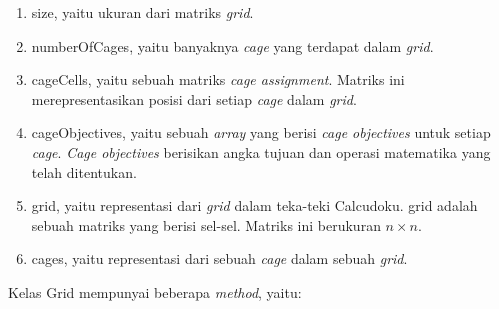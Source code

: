 \begin{enumerate}
\item size, yaitu ukuran dari matriks \textit{grid}.
\item numberOfCages, yaitu banyaknya \textit{cage} yang terdapat dalam \textit{grid}.
\item cageCells, yaitu sebuah matriks \textit{cage assignment}. Matriks ini merepresentasikan posisi dari setiap \textit{cage} dalam \textit{grid}.
\item cageObjectives, yaitu sebuah \textit{array} yang berisi \textit{cage objectives} untuk setiap \textit{cage}. \textit{Cage objectives} berisikan angka tujuan dan operasi matematika yang telah ditentukan.
\item grid, yaitu representasi dari \textit{grid} dalam teka-teki Calcudoku. grid adalah sebuah matriks yang berisi sel-sel. Matriks ini berukuran \begin{math} n \times n\end{math}.
\item cages, yaitu representasi dari sebuah \textit{cage} dalam sebuah \textit{grid}.
\end{enumerate}

Kelas Grid mempunyai beberapa \textit{method}, yaitu:

